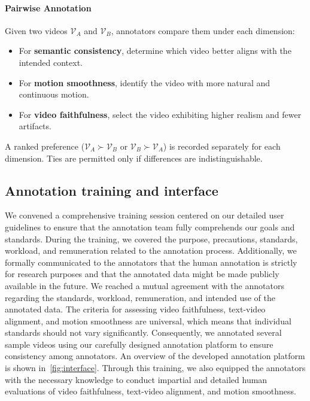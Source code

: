 \paragraph{Pairwise Annotation}
Given two videos $\mathcal{V}_A$ and $\mathcal{V}_B$, annotators compare them under each dimension:
\begin{itemize}
    \item For \textbf{semantic consistency}, determine which video better aligns with the intended context.
    \item For \textbf{motion smoothness}, identify the video with more natural and continuous motion.
    \item For \textbf{video faithfulness}, select the video exhibiting higher realism and fewer artifacts.
\end{itemize}
A ranked preference ($\mathcal{V}_A \succ \mathcal{V}_B$ or $\mathcal{V}_B \succ \mathcal{V}_A$) is recorded separately for each dimension. Ties are permitted only if differences are indistinguishable.



\subsection{Annotation training and interface}
We convened a comprehensive training session centered on our detailed user guidelines to ensure that the annotation team fully comprehends our goals and standards. During the training, we covered the purpose, precautions, standards, workload, and remuneration related to the annotation process. Additionally, we formally communicated to the annotators that the human annotation is strictly for research purposes and that the annotated data might be made publicly available in the future. We reached a mutual agreement with the annotators regarding the standards, workload, remuneration, and intended use of the annotated data. The criteria for assessing video faithfulness, text-video alignment, and motion smoothness are universal, which means that individual standards should not vary significantly. Consequently, we annotated several sample videos using our carefully designed annotation platform to ensure consistency among annotators. An overview of the developed annotation platform is shown in~\cref{fig:interface}. Through this training, we also equipped the annotators with the necessary knowledge to conduct impartial and detailed human evaluations of video faithfulness, text-video alignment, and motion smoothness.


